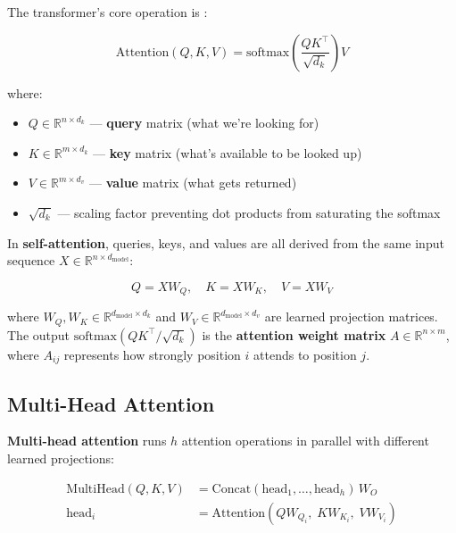 The transformer's core operation is  \autocite{vaswani2017attention}:

\begin{equation}
\text{Attention}(Q, K, V) = \text{softmax}\!\left(\frac{QK^\top}{\sqrt{d_k}}\right) V
\label{eq:attention}
\end{equation}

where:
\begin{itemize}[noitemsep]
    \item $Q \in \mathbb{R}^{n \times d_k}$ --- \textbf{query} matrix (what we're looking for)
    \item $K \in \mathbb{R}^{m \times d_k}$ --- \textbf{key} matrix (what's available to be looked up)
    \item $V \in \mathbb{R}^{m \times d_v}$ --- \textbf{value} matrix (what gets returned)
    \item $\sqrt{d_k}$ --- scaling factor preventing dot products from saturating the softmax
\end{itemize}

In \textbf{self-attention}, queries, keys, and values are all derived from the same input sequence $X \in \mathbb{R}^{n \times d_{\text{model}}}$:

\begin{equation}
Q = X W_Q, \quad K = X W_K, \quad V = X W_V
\label{eq:qkv}
\end{equation}

where $W_Q, W_K \in \mathbb{R}^{d_{\text{model}} \times d_k}$ and $W_V \in \mathbb{R}^{d_{\text{model}} \times d_v}$ are learned projection matrices. The output $\text{softmax}(QK^\top/\sqrt{d_k})$ is the \textbf{attention weight matrix} $A \in \mathbb{R}^{n \times m}$, where $A_{ij}$ represents how strongly position $i$ attends to position $j$.

\subsection{Multi-Head Attention}

\textbf{Multi-head attention} runs $h$ attention operations in parallel with different learned projections:

\begin{align}
\text{MultiHead}(Q, K, V) &= \text{Concat}(\text{head}_1, \ldots, \text{head}_h)\, W_O \\
\text{head}_i &= \text{Attention}(Q W_{Q_i},\; K W_{K_i},\; V W_{V_i})
\label{eq:multihead}
\end{align}

